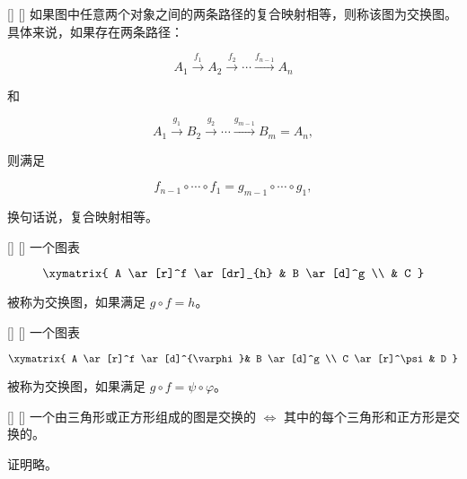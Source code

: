 \documentclass[UTF8]{ctexart}
\begin{document}
        \begin{dfn}
            []
            {}
            []
            []
            如果图中任意两个对象之间的两条路径的复合映射相等，则称该图为交换图。具体来说，如果存在两条路径：

            \[
            A_1 \xrightarrow{f_1} A_2 \xrightarrow{f_2} \cdots \xrightarrow{f_{n-1}} A_n
            \]

            和

            \[
            A_1 \xrightarrow{g_1} B_2 \xrightarrow{g_2} \cdots \xrightarrow{g_{m-1}} B_m = A_n,
            \]

            则满足

            \[
            f_{n-1} \circ \cdots \circ f_1 = g_{m-1} \circ \cdots \circ g_1,
            \]

            换句话说，复合映射相等。
       \end{dfn}

        \begin{xmp}
            []
            {}
            []
            []
            一个图表

            \[
                \xymatrix{
                    A \ar[r]^f \ar[dr]_{h} & B \ar[d]^g \\
                    & C
                }
            \]
            
            被称为交换图，如果满足 \( g \circ f = h \)。
       \end{xmp}

        \begin{xmp}
            []
            {}
            []
            []
            一个图表

            \[
                \xymatrix{
                    A \ar[r]^f \ar[d]^{\varphi}& B \ar[d]^g \\
                    C \ar[r]^\psi  & D 
                }
            \]

            被称为交换图，如果满足 \( g \circ f = \psi \circ \varphi \)。
       \end{xmp}

        \begin{thm}
            []
            {}
            []
            []
        一个由三角形或正方形组成的图是交换的 $\Leftrightarrow$ 其中的每个三角形和正方形是交换的。
       \end{thm}

        \begin{prf}
            证明略。
        \end{prf}
\end{document}
